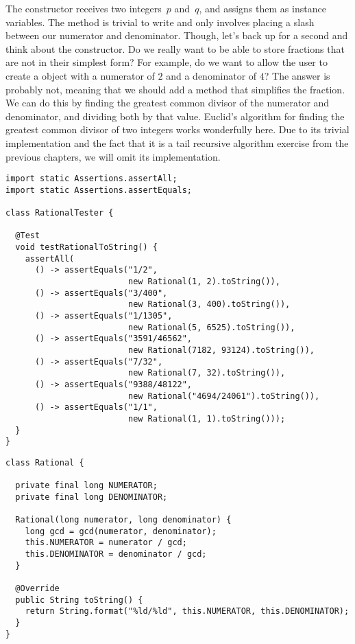 The  constructor receives two integers~$p$ and~$q$, and assigns them as instance variables. The  method is trivial to write and only involves placing a slash between our numerator and denominator. Though, let's back up for a second and think about the constructor. Do we really want to be able to store fractions that are not in their simplest form? For example, do we want to allow the user to create a  object with a numerator of $2$ and a denominator of $4$? The answer is probably not, meaning that we should add a method that simplifies the fraction. We can do this by finding the greatest common divisor of the numerator and denominator, and dividing both by that value. Euclid's algorithm for finding the greatest common divisor of two integers works wonderfully here. Due to its trivial implementation and the fact that it is a tail recursive algorithm exercise from the previous chapters, we will omit its implementation.

\begin{lstlisting}[language=MyJava]
import static Assertions.assertAll;
import static Assertions.assertEquals;

class RationalTester {
  
  @Test
  void testRationalToString() {
    assertAll(
      () -> assertEquals("1/2", 
                         new Rational(1, 2).toString()),
      () -> assertEquals("3/400", 
                         new Rational(3, 400).toString()),
      () -> assertEquals("1/1305", 
                         new Rational(5, 6525).toString()),
      () -> assertEquals("3591/46562", 
                         new Rational(7182, 93124).toString()),
      () -> assertEquals("7/32", 
                         new Rational(7, 32).toString()),
      () -> assertEquals("9388/48122", 
                         new Rational("4694/24061").toString()),
      () -> assertEquals("1/1", 
                         new Rational(1, 1).toString()));
  }
}
\end{lstlisting}

\begin{lstlisting}[language=MyJava]
class Rational {
  
  private final long NUMERATOR;
  private final long DENOMINATOR;

  Rational(long numerator, long denominator) {
    long gcd = gcd(numerator, denominator);
    this.NUMERATOR = numerator / gcd;
    this.DENOMINATOR = denominator / gcd; 
  }

  @Override
  public String toString() {
    return String.format("%ld/%ld", this.NUMERATOR, this.DENOMINATOR);
  }
}
\end{lstlisting}

